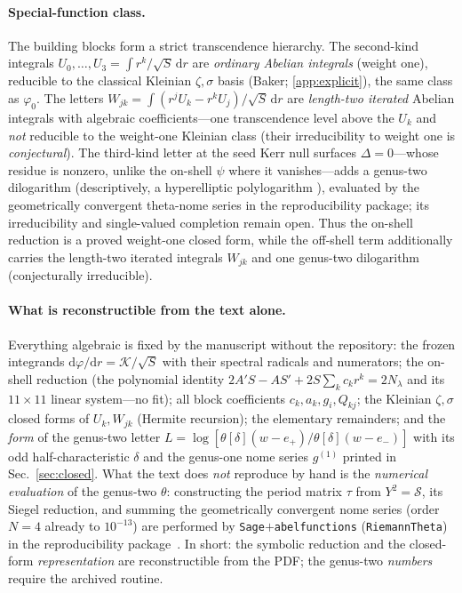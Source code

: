 \documentclass[12pt]{iopart}
\newcommand{\dd}{\mathrm{d}}
\begin{document}
\paragraph{Special-function class.} The building blocks form a strict transcendence
hierarchy. The second-kind integrals $U_0,\dots,U_3=\int r^k/\sqrt S\,\dd r$ are
\emph{ordinary Abelian integrals} (weight one), reducible to the classical Kleinian
$\zeta,\sigma$ basis (Baker; \ref{app:explicit}), the same class as $\varphi_0$. The
letters $W_{jk}=\int(r^jU_k-r^kU_j)/\sqrt S\,\dd r$ are \emph{length-two iterated} Abelian
integrals with algebraic coefficients---one transcendence level above the $U_k$ and
\emph{not} reducible to the weight-one Kleinian class (their irreducibility to weight one
is \emph{conjectural}). The third-kind letter at the seed Kerr null surfaces
$\Delta=0$---whose residue is nonzero, unlike the on-shell $\psi$ where it
vanishes---adds a genus-two dilogarithm (descriptively, a hyperelliptic polylogarithm
\cite{BauneEtal2024,DHokerHiddingSchlotterer2025}), evaluated by the geometrically
convergent theta-nome series in the reproducibility package; its irreducibility and
single-valued completion remain open. Thus the on-shell reduction is a proved weight-one
closed form, while the off-shell term additionally carries the length-two iterated
integrals $W_{jk}$ and one genus-two dilogarithm (conjecturally irreducible).

\paragraph{What is reconstructible from the text alone.} Everything algebraic is fixed
by the manuscript without the repository: the frozen integrands
$\dd\varphi/\dd r=\mathcal K/\sqrt S$ with their spectral radicals and numerators;
the on-shell reduction (the polynomial identity $2A'S-AS'+2S\sum_k c_kr^k=2N_\lambda$
and its $11\times11$ linear system---no fit); all block coefficients $c_k,a_k,g_i,Q_{kj}$;
the Kleinian $\zeta,\sigma$ closed forms of $U_k,W_{jk}$ (Hermite recursion); the elementary
remainders; and the \emph{form} of the genus-two letter
$L=\log[\theta[\delta](w-e_+)/\theta[\delta](w-e_-)]$ with its odd half-characteristic
$\delta$ and the genus-one nome series $g^{(1)}$ printed in
Sec.~\ref{sec:closed}. What the text does \emph{not} reproduce by hand is the
\emph{numerical evaluation} of the genus-two $\theta$: constructing the period matrix
$\tau$ from $Y^2=\mathcal S$, its Siegel reduction, and summing the geometrically
convergent nome series (order $N{=}4$ already to $10^{-13}$) are performed by
\texttt{Sage}$+$\texttt{abelfunctions} (\texttt{RiemannTheta}) in the reproducibility
package~\cite{Rosignoli2026Code}. In short: the symbolic reduction and the closed-form
\emph{representation} are reconstructible from the PDF; the genus-two \emph{numbers}
require the archived routine.
\end{document}
